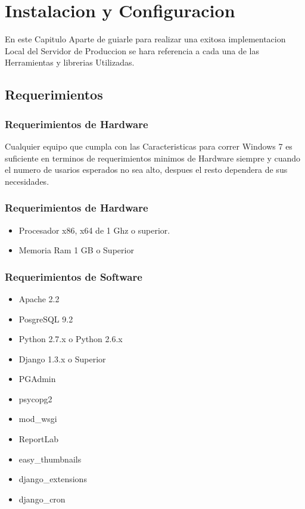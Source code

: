 \chapter{Instalacion y Configuracion}

En este Capitulo Aparte de guiarle para realizar una exitosa implementacion
Local del Servidor de Produccion se hara referencia a cada una de las
Herramientas y librerias Utilizadas.

\section{Requerimientos}

\subsection{Requerimientos de Hardware}

Cualquier equipo que cumpla con las Caracteristicas para correr Windows 7 es suficiente
en terminos de requerimientos minimos de Hardware siempre y cuando el numero de usarios
esperados no sea alto, despues el resto dependera de sus necesidades.\\[0.5cm]

\subsection{Requerimientos de Hardware}

\begin{itemize}
    \item Procesador x86, x64 de 1 Ghz o superior.
    \item Memoria Ram 1 GB o Superior 
\end{itemize}


\subsection{Requerimientos de Software}


\begin{itemize}
    \item Apache 2.2
    \item PosgreSQL 9.2
    \item Python 2.7.x o Python 2.6.x
    \item Django 1.3.x o Superior
    \item PGAdmin
    \item psycopg2
    \item mod\_wsgi
    \item ReportLab
    \item easy\_thumbnails
    \item django\_extensions
    \item django\_cron
\end{itemize}


